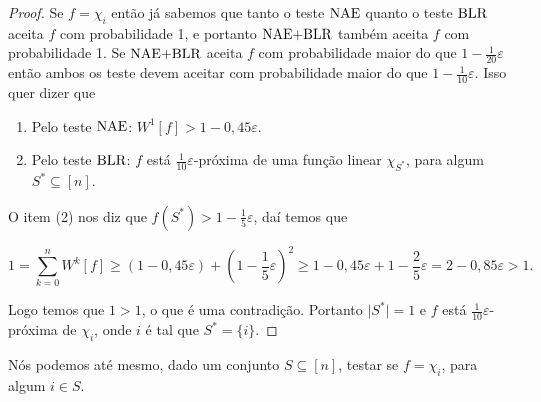 \begin{proof}

Se $f = \chi_{i}$ então já sabemos que tanto o teste $\text{NAE}$ quanto o teste $\text{BLR}$ aceita $f$ com probabilidade 1, e portanto $\text{NAE+BLR}$ também aceita $f$ com probabilidade 1. Se $\text{NAE+BLR}$ aceita $f$ com probabilidade maior do que $1 - \frac{1}{20}\varepsilon$ então ambos os teste devem aceitar com probabilidade maior do que $1 - \frac{1}{10}\varepsilon$. Isso quer dizer que

\begin{enumerate}

	\item Pelo teste $\text{NAE}$: $W^{1}[f] > 1 - 0,45\varepsilon$.
	
	\item Pelo teste $\text{BLR}$: $f$ está $\frac{1}{10}\varepsilon$-próxima de uma função linear $\chi_{S^{*}}$, para algum $S^{*} \subseteq [n]$.

\end{enumerate}

O item (2) nos diz que $\widehat{f}(S^{*}) > 1 - \frac{1}{5}\varepsilon$, daí temos que

\begin{equation*}
	1 = \sum_{k = 0}^{n}W^{k}[f] \geq (1 - 0,45\varepsilon) + (1 - \frac{1}{5}\varepsilon)^{2} \geq 1 - 0,45\varepsilon + 1 -\frac{2}{5}\varepsilon = 2 - 0,85\varepsilon > 1.
\end{equation*}

Logo temos que $1 > 1$, o que é uma contradição. Portanto $\lvert S^{*} \rvert = 1$ e $f$ está $\frac{1}{10}\varepsilon$-próxima de $\chi_{i}$, onde $i$ é tal que $S^{*} = \{i\}$.

\end{proof}

Nós podemos até mesmo, dado um conjunto $S \subseteq [n]$, testar se $f = \chi_{i}$, para algum $i \in S$.